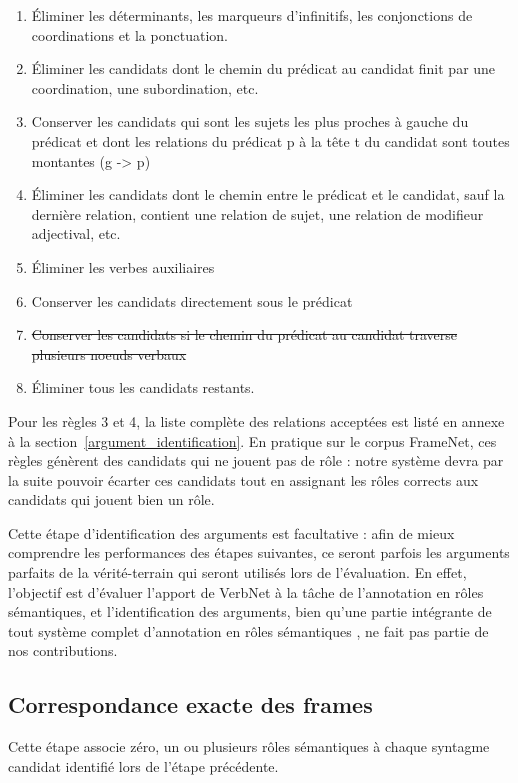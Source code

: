\begin{enumerate}
    \item Éliminer les déterminants, les marqueurs d'infinitifs, les conjonctions de coordinations et la ponctuation.
    \item Éliminer les candidats dont le chemin du prédicat au candidat finit par une coordination, une subordination, etc.
    \item Conserver les candidats qui sont les sujets les plus proches à gauche du prédicat et dont les relations du prédicat p à la tête t du candidat sont toutes montantes (g -> p)
    \item Éliminer les candidats  dont le chemin entre le prédicat et le candidat, sauf la dernière relation, contient une relation de sujet, une relation de modifieur adjectival, etc.
    \item Éliminer les verbes auxiliaires
    \item Conserver les candidats directement sous le prédicat
    \item \sout{Conserver les candidats si le chemin du prédicat au candidat traverse plusieurs noeuds verbaux}
    \item Éliminer tous les candidats restants.
\end{enumerate}

Pour les règles 3 et 4, la liste complète des relations acceptées est listé en
annexe à la section~\ref{argument_identification}. En pratique sur le corpus
FrameNet, ces règles génèrent des candidats qui ne jouent pas de rôle : notre
système devra par la suite pouvoir écarter ces candidats tout en assignant les
rôles corrects aux candidats qui jouent bien un rôle.

Cette étape d'identification des arguments est facultative : afin de mieux
comprendre les performances des étapes suivantes, ce seront parfois les
arguments parfaits de la vérité-terrain qui seront utilisés lors de
l'évaluation. En effet, l'objectif est d'évaluer l'apport de VerbNet à la tâche
de l'annotation en rôles sémantiques, et l'identification des arguments, bien
qu'une partie intégrante de tout système complet d'annotation en rôles
sémantiques \citep{das2010probabilistic}, ne fait pas partie de nos
contributions.

\subsection{Correspondance exacte des frames}

Cette étape associe zéro, un ou plusieurs rôles sémantiques à chaque syntagme
candidat identifié lors de l'étape précédente.

